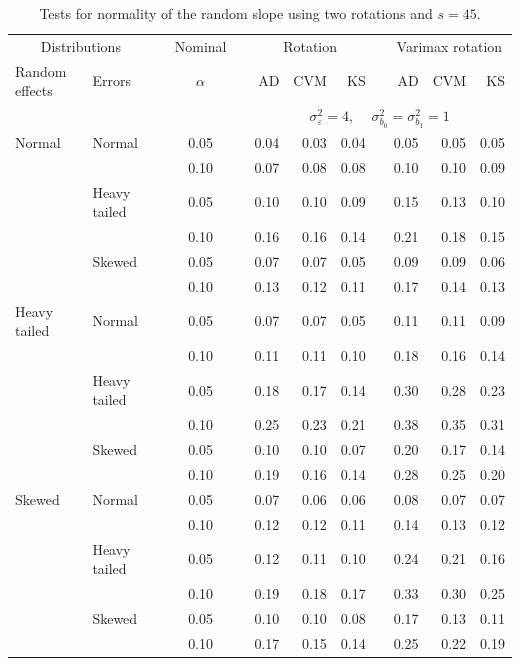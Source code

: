 \documentclass[12pt]{article} %
\begin{document}
\begin{table}[ht]
\caption{Tests for normality of the random slope using two rotations and $s = 45$.}
\begin{scriptsize}
\begin{center}
\begin{tabular}{ll p{.1cm} c p{.1cm} rrr p{.1cm} rrr}
  \hline
  \multicolumn{2}{c}{Distributions}& & Nominal & &  \multicolumn{3}{c}{Rotation} & & \multicolumn{3}{c}{Varimax rotation} \\ \cline{1-2} \cline{6-8} \cline{10-12}   
  Random effects & Errors & & $\alpha$ & & AD & CVM & KS & & AD & CVM & KS \\ 
   \hline
& && && \multicolumn{7}{c}{$\sigma_{\varepsilon}^2 = 4$, \ \ $\sigma_{b_0}^2 = \sigma_{b_1}^2 = 1$} \\ \cline{6-12}
Normal       & Normal       && 0.05 &&  0.04 & 0.03 & 0.04 && 0.05 & 0.05 & 0.05 \\ 
             &              && 0.10 &&  0.07 & 0.08 & 0.08 && 0.10 & 0.10 & 0.09 \\ 
             & Heavy tailed && 0.05 &&  0.10 & 0.10 & 0.09 && 0.15 & 0.13 & 0.10 \\ 
             &              && 0.10 &&  0.16 & 0.16 & 0.14 && 0.21 & 0.18 & 0.15 \\ 
             & Skewed       && 0.05 &&  0.07 & 0.07 & 0.05 && 0.09 & 0.09 & 0.06 \\ 
             &              && 0.10 &&  0.13 & 0.12 & 0.11 && 0.17 & 0.14 & 0.13 \\ 
Heavy tailed & Normal       && 0.05 &&  0.07 & 0.07 & 0.05 && 0.11 & 0.11 & 0.09 \\ 
             &              && 0.10 &&  0.11 & 0.11 & 0.10 && 0.18 & 0.16 & 0.14 \\ 
             & Heavy tailed && 0.05 &&  0.18 & 0.17 & 0.14 && 0.30 & 0.28 & 0.23 \\ 
             &              && 0.10 &&  0.25 & 0.23 & 0.21 && 0.38 & 0.35 & 0.31 \\ 
             & Skewed       && 0.05 &&  0.10 & 0.10 & 0.07 && 0.20 & 0.17 & 0.14 \\ 
             &              && 0.10 &&  0.19 & 0.16 & 0.14 && 0.28 & 0.25 & 0.20 \\ 
Skewed       & Normal       && 0.05 &&  0.07 & 0.06 & 0.06 && 0.08 & 0.07 & 0.07 \\ 
             &              && 0.10 &&  0.12 & 0.12 & 0.11 && 0.14 & 0.13 & 0.12 \\ 
             & Heavy tailed && 0.05 &&  0.12 & 0.11 & 0.10 && 0.24 & 0.21 & 0.16 \\ 
             &              && 0.10 &&  0.19 & 0.18 & 0.17 && 0.33 & 0.30 & 0.25 \\ 
             & Skewed       && 0.05 &&  0.10 & 0.10 & 0.08 && 0.17 & 0.13 & 0.11 \\ 
             &              && 0.10 &&  0.17 & 0.15 & 0.14 && 0.25 & 0.22 & 0.19 \\ 


\end{tabular}
\end{center}
\end{scriptsize}
\end{table}
\end{document}
